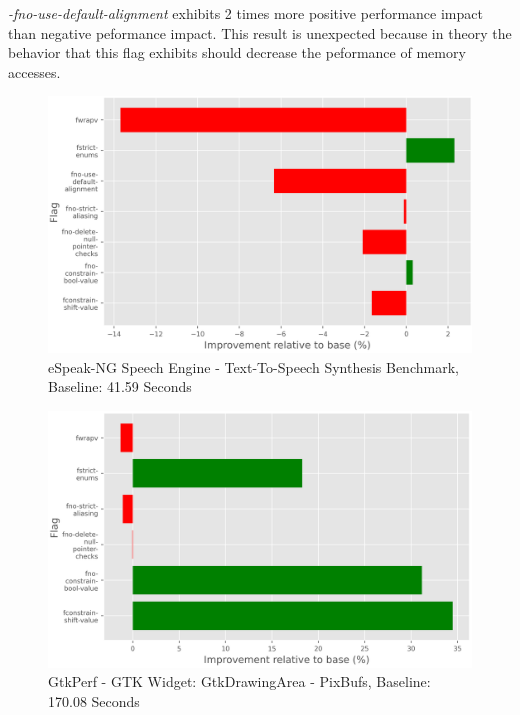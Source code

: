 \textit{-fno-use-default-alignment} exhibits 2 times more positive performance
impact than negative peformance impact. This result is unexpected because in
theory the behavior that this flag exhibits should decrease the peformance of
memory accesses.

\begin{figure}[H]
\includegraphics[scale=0.8]{espeak}
\caption{eSpeak-NG Speech Engine - Text-To-Speech Synthesis Benchmark, Baseline:
41.59 Seconds}
\label{fig:espeak}
\end{figure}

\begin{figure}[H]
\includegraphics[scale=0.8]{gtkperf}
\caption{GtkPerf - GTK Widget: GtkDrawingArea - PixBufs, Baseline: 170.08
Seconds}
\label{fig:gtkperf}
\end{figure}
